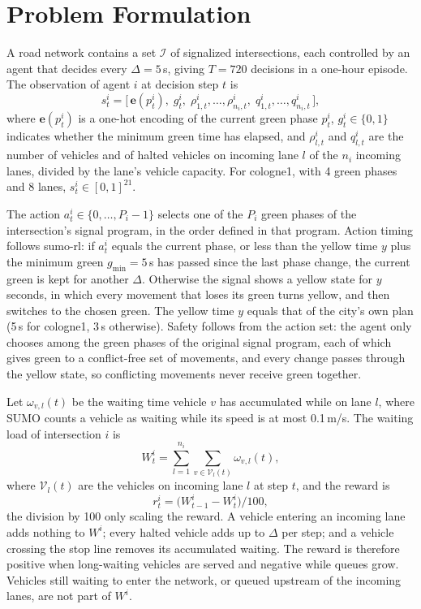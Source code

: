 \section{Problem Formulation}
\label{sec:problem}

A road network contains a set $\mathcal{I}$ of signalized intersections, each controlled by an agent that decides every $\Delta = 5$\,s, giving $T = 720$ decisions in a one-hour episode. The observation of agent $i$ at decision step $t$ is
\begin{equation}
  s^i_t = \big[\,\mathbf{e}(p^i_t),\; g^i_t,\; \rho^i_{1,t},\dots,\rho^i_{n_i,t},\; q^i_{1,t},\dots,q^i_{n_i,t}\,\big],
\end{equation}
where $\mathbf{e}(p^i_t)$ is a one-hot encoding of the current green phase $p^i_t$, $g^i_t \in \{0,1\}$ indicates whether the minimum green time has elapsed, and $\rho^i_{l,t}$ and $q^i_{l,t}$ are the number of vehicles and of halted vehicles on incoming lane $l$ of the $n_i$ incoming lanes, divided by the lane's vehicle capacity. For cologne1, with 4 green phases and 8 lanes, $s^i_t \in [0,1]^{21}$.

The action $a^i_t \in \{0,\dots,P_i-1\}$ selects one of the $P_i$ green phases of the intersection's signal program, in the order defined in that program. Action timing follows sumo-rl: if $a^i_t$ equals the current phase, or less than the yellow time $y$ plus the minimum green $g_{\min} = 5$\,s has passed since the last phase change, the current green is kept for another $\Delta$. Otherwise the signal shows a yellow state for $y$ seconds, in which every movement that loses its green turns yellow, and then switches to the chosen green. The yellow time $y$ equals that of the city's own plan (5\,s for cologne1, 3\,s otherwise). Safety follows from the action set: the agent only chooses among the green phases of the original signal program, each of which gives green to a conflict-free set of movements, and every change passes through the yellow state, so conflicting movements never receive green together.

Let $\omega_{v,l}(t)$ be the waiting time vehicle $v$ has accumulated while on lane $l$, where SUMO counts a vehicle as waiting while its speed is at most 0.1\,m/s. The waiting load of intersection $i$ is
\begin{equation}
  W^i_t = \sum_{l=1}^{n_i} \sum_{v \in \mathcal{V}_l(t)} \omega_{v,l}(t),
\end{equation}
where $\mathcal{V}_l(t)$ are the vehicles on incoming lane $l$ at step $t$, and the reward is
\begin{equation}
  r^i_t = \big(W^i_{t-1} - W^i_t\big)/100,
  \label{eq:reward}
\end{equation}
the division by 100 only scaling the reward. A vehicle entering an incoming lane adds nothing to $W^i$; every halted vehicle adds up to $\Delta$ per step; and a vehicle crossing the stop line removes its accumulated waiting. The reward is therefore positive when long-waiting vehicles are served and negative while queues grow. Vehicles still waiting to enter the network, or queued upstream of the incoming lanes, are not part of $W^i$.

